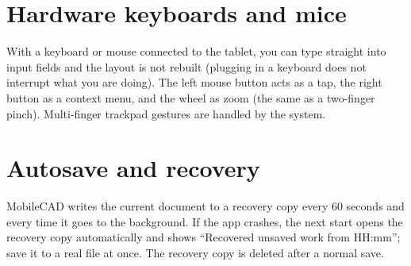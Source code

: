 \section{Hardware keyboards and mice}

With a keyboard or mouse connected to the tablet, you can type straight into input fields and the layout is not
rebuilt (plugging in a keyboard does not interrupt what you are doing). The left mouse button acts as a tap, the right
button as a context menu, and the wheel as zoom (the same as a two-finger pinch). Multi-finger trackpad gestures are
handled by the system.

\section{Autosave and recovery}

MobileCAD writes the current document to a recovery copy every 60 seconds and every time it goes to the background.
If the app crashes, the next start opens the recovery copy automatically and shows ``Recovered unsaved work from HH:mm'';
save it to a real file at once. The recovery copy is deleted after a normal save.
